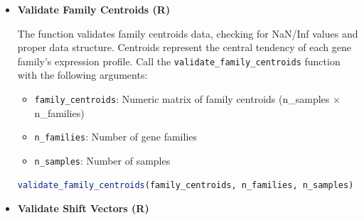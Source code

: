 \begin{enumerate}
\begin{itemize}
\begin{itemize}
                    \item \texttt{n\_samples}: Number of samples
                          
                    \item \textbf{(Optional)} \texttt{check\_non\_negative}: Logical flag to
                          check for non-negative values (default: TRUE)
                  \end{itemize}
                  
                  \begin{lstlisting}[language=R, caption={R Validate Expression Data}]
validate_expression_data(expression_vectors, n_genes, n_samples, 
    check_non_negative = TRUE)
                  \end{lstlisting}
                  
            \item \textbf{Validate Family Centroids (R)}
                  
                  The function validates family centroids data, checking for NaN/Inf values
                  and proper data structure. Centroids represent the central tendency of each
                  gene family's expression profile. Call the \texttt{validate\_family\_centroids}
                  function with the following arguments:
                  
                  \begin{itemize}
                    \item \texttt{family\_centroids}: Numeric matrix of family centroids (n\_samples
                          × n\_families)
                          
                    \item \texttt{n\_families}: Number of gene families
                          
                    \item \texttt{n\_samples}: Number of samples
                  \end{itemize}
                  
                  \begin{lstlisting}[language=R, caption={R Validate Family Centroids}]
validate_family_centroids(family_centroids, n_families, n_samples)
                  \end{lstlisting}
                  
            \item \textbf{Validate Shift Vectors (R)}
                  

\end{itemize}
\end{enumerate}
